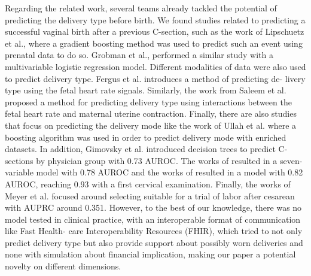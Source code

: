 Regarding the related work, several teams already tackled the potential of predicting the delivery type before birth. We found studies related to predicting a successful vaginal birth after a previous C-section, such as the work of Lipschuetz et al., \cite{lipschuetzPredictionVaginalBirth2020}  where a gradient boosting method was used to predict such an event using prenatal data to do so. Grobman et al., \cite{grobman_development_2007} performed a similar study with a multivariable logistic regression model. Different modalities of data were also used to predict delivery type. Fergus et al. \cite{fergusClassificationCaesareanSection2017} introduces a method of predicting de- livery type using the fetal heart rate signals. Similarly, the work from Saleem et al. \cite{saleemStrategyClassificationVaginal2019a} proposed a method for predicting delivery type using interactions between the fetal heart rate and maternal uterine contraction. Finally, there are also studies that focus on predicting the delivery mode like the work of Ullah et al. \cite{ullah_reliable_2021} where a boosting algorithm was used in order to predict delivery mode with enriched datasets. In addition, Gimovsky et al. \cite{gimovskyBenchmarkingCesareanDelivery} introduced decision trees to predict C-sections by physician group with 0.73 AUROC. The works of \cite{rossiRiskCalculatorPredict2020b} resulted in a seven-variable model with 0.78 AUROC and the works of \cite{guedaliaRealtimeDataAnalysis2020} resulted in a model with 0.82 AUROC, reaching 0.93 with a first cervical examination. Finally, the works of Meyer et al. \cite{meyerImplementationMachineLearning2020} focused around selecting suitable for a trial of labor after cesarean with AUPRC around 0.351. However, to the best of our knowledge, there was no model tested in clinical practice, with an interoperable format of communication like Fast Health- care Interoperability Resources (FHIR), which tried to not only predict delivery type but also provide support about possibly worn deliveries and none with simulation about financial implication, making our paper a potential novelty on different dimensions.